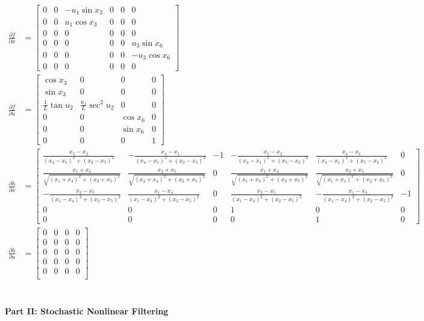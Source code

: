 \documentclass[paper=a4, fontsize=11pt]{scrartcl} %
\numberwithin{equation}{section} %
\numberwithin{figure}{section} %
\numberwithin{table}{section} %
\begin{document}
\begin{framed}
\begin{align*}
    \frac{\partial f}{\partial x} &= 
    \begin{bmatrix} 0 & 0 & -u_1\sin x_3 & 0 & 0 & 0 \\ 
                    0 & 0 & u_1\cos x_3 & 0 & 0 & 0 \\ 
                    0 & 0 & 0 & 0 & 0 & 0 \\ 
                    0 & 0 & 0 & 0 & 0 & u_3\sin x_6 \\ 
                    0 & 0 & 0 & 0 & 0 & -u_3 \cos x_6 \\ 
                    0 & 0 & 0 & 0 & 0 & 0 \end{bmatrix} \\
    \frac{\partial f}{\partial u} &= 
      \begin{bmatrix} \cos x_3 & 0 & 0 & 0 \\ 
      \sin x_3 & 0 & 0 & 0 \\ 
      \frac{1}{L} \tan u_2 & \frac{u_1}{L}\sec^2u_2 & 0 & 0 \\ 
       0 & 0 & \cos x_6 & 0 \\ 
       0 & 0 & \sin x_6 & 0 \\ 
       0 & 0 & 0 & 1 
       \end{bmatrix} \\
    \frac{\partial h}{\partial x} &= 
    \begin{bmatrix} \frac{x_5-x_2}{(x_4-x_1)^2+(x_2-x_5)^2} & -\frac{x_4-x_1}{(x_4-x_1)^2+(x_2-x_5)^2} & -1 & -\frac{x_5-x_2}{(x_4-x_1)^2+(x_5-x_2)^2} & \frac{x_4-x_1}{(x_4-x_1)^2+(x_5-x_2)^2} & 0 \\
    \frac{x_1+x_4}{\sqrt{(x_1+x_4)^2+(x_2+x_5)^2}} & \frac{x_2+x_5}{\sqrt{(x_1+x_4)^2+(x_2+x_5)^2}} & 0 & \frac{x_1 + x_4}{\sqrt{(x_1+x_4)^2+(x_2+x_5)^2}} & \frac{x_2+x_5}{\sqrt{(x_1+x_4)^2+(x_2+x_5)^2}} & 0 \\ 
    -\frac{x_2-x_5}{(x_1-x_4)^2+(x_2-x_5)^2} & \frac{x_1-x_4}{(x_1-x_4)^2+(x_2-x_5)^2} & 0 & \frac{x_2-x_5}{(x_1-x_4)^2+(x_2-x_5)^2} & 
    -\frac{x_1-x_4}{(x_1-x_4)^2+(x_2-x_5)^2} & -1 \\
    0 & 0 & 0 & 1 & 0 & 0 \\ 0 & 0 & 0 & 0 & 1 & 0 \end{bmatrix} \\
    \frac{\partial h}{\partial u} &= 
      \begin{bmatrix} 0 & 0 & 0 & 0  \\ 
                      0 & 0 & 0 & 0  \\ 
                      0 & 0 & 0 & 0  \\ 
                      0 & 0 & 0 & 0  \\ 
                      0 & 0 & 0 & 0  \\ 
                     \end{bmatrix} \\
\end{align*}




\end{framed}


\textbf{\\ Part II: Stochastic Nonlinear Filtering }
\begin{framed}
   
\end{framed}
\end{document}
